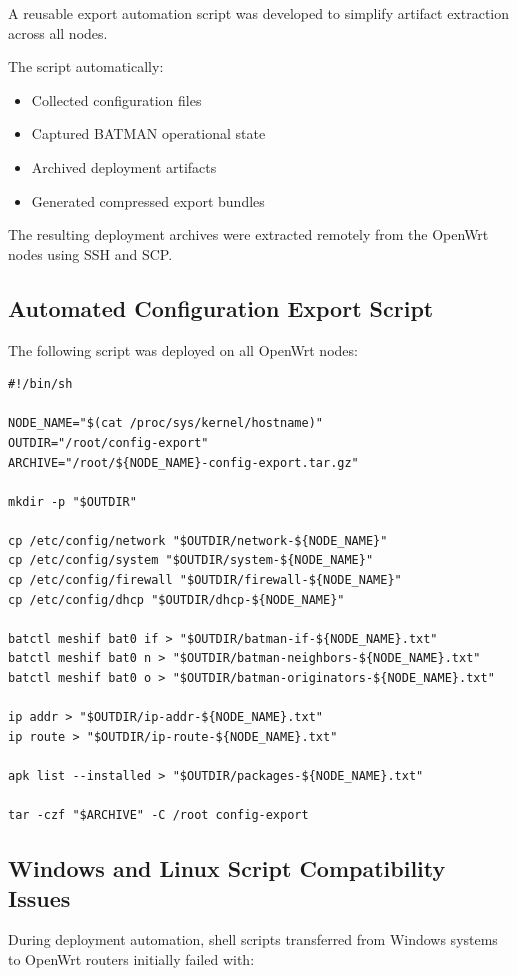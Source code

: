 \documentclass[conference]{IEEEtran}
\begin{document}
A reusable export automation script was developed to simplify artifact extraction across all nodes.

The script automatically:
\begin{itemize}
    \item Collected configuration files
    \item Captured BATMAN operational state
    \item Archived deployment artifacts
    \item Generated compressed export bundles
\end{itemize}

The resulting deployment archives were extracted remotely from the OpenWrt nodes using SSH and SCP.

\subsection{Automated Configuration Export Script}

The following script was deployed on all OpenWrt nodes:

\begin{verbatim}
#!/bin/sh

NODE_NAME="$(cat /proc/sys/kernel/hostname)"
OUTDIR="/root/config-export"
ARCHIVE="/root/${NODE_NAME}-config-export.tar.gz"

mkdir -p "$OUTDIR"

cp /etc/config/network "$OUTDIR/network-${NODE_NAME}"
cp /etc/config/system "$OUTDIR/system-${NODE_NAME}"
cp /etc/config/firewall "$OUTDIR/firewall-${NODE_NAME}"
cp /etc/config/dhcp "$OUTDIR/dhcp-${NODE_NAME}"

batctl meshif bat0 if > "$OUTDIR/batman-if-${NODE_NAME}.txt"
batctl meshif bat0 n > "$OUTDIR/batman-neighbors-${NODE_NAME}.txt"
batctl meshif bat0 o > "$OUTDIR/batman-originators-${NODE_NAME}.txt"

ip addr > "$OUTDIR/ip-addr-${NODE_NAME}.txt"
ip route > "$OUTDIR/ip-route-${NODE_NAME}.txt"

apk list --installed > "$OUTDIR/packages-${NODE_NAME}.txt"

tar -czf "$ARCHIVE" -C /root config-export
\end{verbatim}

\subsection{Windows and Linux Script Compatibility Issues}

During deployment automation, shell scripts transferred from Windows systems to OpenWrt routers initially failed with:
\end{document}
